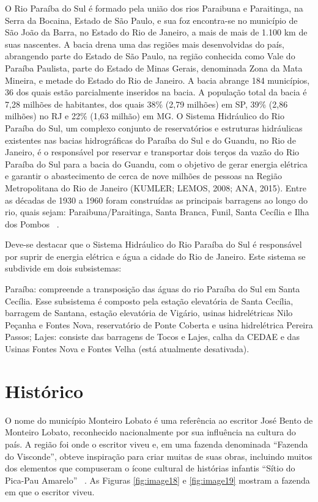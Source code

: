 O Rio Paraíba do Sul é formado pela união dos rios Paraibuna e Paraitinga, na Serra da Bocaina, Estado de São Paulo, e sua foz encontra-se no município de São João da Barra, no Estado do Rio de Janeiro, a mais de mais de 1.100 km de suas nascentes. A bacia drena uma das regiões mais desenvolvidas do país, abrangendo parte do Estado de São Paulo, na região conhecida como Vale do Paraíba Paulista, parte do Estado de Minas Gerais, denominada Zona da Mata Mineira, e metade do Estado do Rio de Janeiro. A bacia abrange 184 municípios, 36 dos quais estão parcialmente inseridos na bacia. A população  total da bacia é 7,28 milhões de habitantes, dos quais 38\% (2,79 milhões) em SP, 39\% (2,86 milhões) no RJ e 22\% (1,63 milhão) em MG. O Sistema Hidráulico do Rio Paraíba do Sul, um complexo conjunto de reservatórios e estruturas hidráulicas existentes nas bacias hidrográficas do Paraíba do Sul e do Guandu, no Rio de Janeiro, é o responsável por reservar e transportar dois terços da vazão do Rio Paraíba do Sul para a bacia do Guandu, com o objetivo de gerar energia elétrica e garantir o abastecimento de cerca de nove milhões de pessoas na Região Metropolitana do Rio de Janeiro (KUMLER; LEMOS, 2008; ANA, 2015). Entre as décadas de 1930 a 1960 foram construídas as principais barragens ao longo do rio, quais sejam: Paraibuna/Paraitinga, Santa Branca, Funil, Santa Cecília e Ilha dos Pombos ~\cite{ANA2017}.

Deve-se destacar que o Sistema Hidráulico do Rio Paraíba do Sul é responsável por suprir de energia elétrica e água a cidade do Rio de Janeiro. Este sistema se subdivide em dois subsistemas:

Paraíba: compreende a transposição das águas do rio Paraíba do Sul em Santa Cecília. Esse subsistema é composto pela estação elevatória de Santa Cecília, barragem de Santana, estação elevatória de Vigário, usinas hidrelétricas Nilo Peçanha e Fontes Nova, reservatório de Ponte Coberta e usina hidrelétrica Pereira Passos;
Lajes: consiste das barragens de Tocos e Lajes, calha da CEDAE e das Usinas Fontes Nova e Fontes Velha (está atualmente desativada).

\section{Histórico}

O nome do município Monteiro Lobato é uma referência ao escritor José Bento de Monteiro Lobato, reconhecido nacionalmente por sua influência na cultura do país. A região foi onde o escritor viveu e, em uma fazenda denominada “Fazenda do Visconde”, obteve inspiração para criar muitas de suas obras, incluindo muitos dos elementos que compuseram o ícone cultural de histórias infantis “Sítio do Pica-Pau Amarelo” ~\cite{squeff2003origem,IBGE2010}. As Figuras \ref{fig:image18} e \ref{fig:image19} mostram a fazenda em que o escritor viveu. 
 
